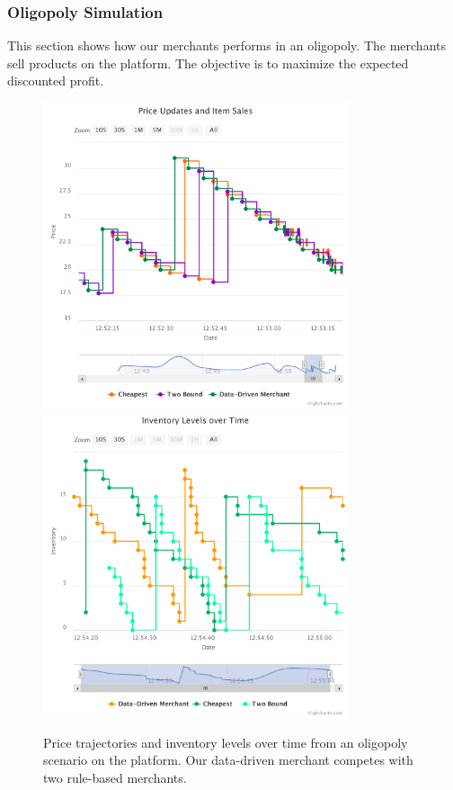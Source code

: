 \subsubsection{Oligopoly Simulation}
This section shows how our merchants performs in an oligopoly.
The merchants sell products on the \pricewars platform.
The objective is to maximize the expected discounted profit.

\begin{figure}[p]
	\centering
	\includegraphics[width=0.8\textwidth]{figures/competition_prices.pdf}
	\includegraphics[width=0.8\textwidth]{figures/competition_inventory.pdf}
	\caption{Price trajectories and inventory levels over time from an oligopoly scenario on the \pricewars platform. Our data-driven merchant competes with two rule-based merchants.}
	\label{fig:competition}
\end{figure}

